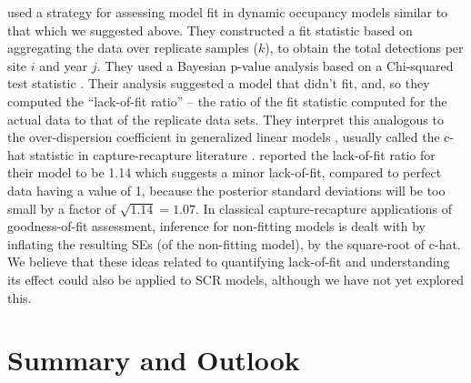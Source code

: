 {\citet{kery_etal:inreview} used a strategy for assessing model
fit in dynamic occupancy models \citep{royle_kery:2007} similar to that which we suggested above.
They constructed a fit statistic based on aggregating the data over
replicate samples ($k$), to obtain the total detections per site $i$
and year $j$.  They used a Bayesian p-value analysis based on a
Chi-squared test statistic \citep[also
see][Chapt. 12]{kery_schaub:2011}.  Their analysis suggested a model
that didn't fit, and, so they computed the ``lack-of-fit ratio''
\cite[see][Sec. 12.3]{kery_schaub:2011} -- the ratio of the fit
statistic computed for the actual data to that of the replicate data
sets.  They interpret this analogous to the over-dispersion coefficient
in generalized linear models \citep{mccullagh_nelder:1989}, usually
called the c-hat statistic in capture-recapture literature
\citep[see][Chapt. 5]{cooch_white:2006}.  \citet{kery_etal:inreview}
reported the lack-of-fit ratio for their model to be 1.14 which
suggests a minor lack-of-fit, compared to perfect data having a value
of 1, because the posterior standard deviations will be too small by a
factor of $\sqrt{1.14} = 1.07$.
In classical capture-recapture
applications of goodness-of-fit assessment, inference for non-fitting
models is dealt with by inflating the resulting SEs (of the non-fitting model),
by the square-root of c-hat. 
We believe that these ideas related to quantifying lack-of-fit and
understanding its effect could also be applied to SCR models, although
we have not yet explored this. 


\begin{comment}
actually, we used that idea of quantifying the degree of lack of fit using some c-hat-like statistic in the BPA book in the comparison of the series of Nmix models in section 12.3. (p. 396 and later). We call this a "lack of fit ratio": e.g., p. 401 in the middle, and then later on p. 404 and 407. I think that this makes sense intuitively, but I wonder whether there is some more theoretical foundation for it ?
\end{comment}


\section{ Summary and Outlook  }



}
